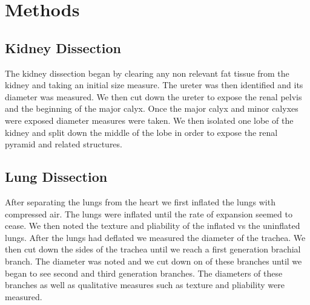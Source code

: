 \documentclass[12pt]{article}
\begin{document}
\section{Methods}
\subsection{Kidney Dissection}
\par{}
The kidney dissection began by clearing any non relevant fat tissue from the kidney and taking an initial size measure. The ureter was then identified and its diameter was measured. We then cut down the ureter to expose the renal pelvis and the beginning of the major calyx. Once the major calyx and minor calyxes were exposed diameter measures were taken. We then isolated one lobe of the kidney and split down the middle of the lobe in order to expose the renal pyramid and related structures.

\subsection{Lung Dissection}
\par{}
After separating the lungs from the heart we first inflated the lungs with compressed air. The lungs were inflated until the rate of expansion seemed to cease. We then noted the texture and pliability of the inflated vs the uninflated lungs. After the lungs had deflated we measured the diameter of the trachea. We then cut down the sides of the trachea until we reach a first generation brachial branch. The diameter was noted and we cut down on of these branches until we began to see second and third generation branches. The diameters of these branches as well as qualitative measures such as texture and pliability were measured.
\end{document}
